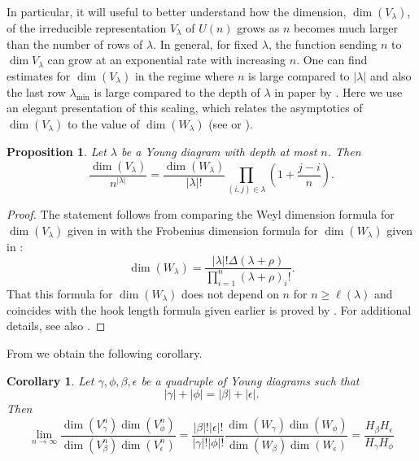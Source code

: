 \documentclass[pdflatex, sn-mathphys-num]{sn-jnl} %
\theoremstyle{plain}
\newtheorem{cor}[thm]{Corollary}
\newtheorem{prop}[thm]{Proposition}
\theoremstyle{definition}
\let\cref\crtcref
\newcommand{\yb}{\beta}
\newcommand{\yc}{\gamma}
\newcommand{\ye}{\epsilon}
\newcommand{\yf}{\phi}
\newcommand{\yx}{\lambda}
\newcommand{\syb}{|\yb|}
\newcommand{\syc}{|\yc|}
\newcommand{\sye}{|\ye|}
\newcommand{\syf}{|\yf|}
\newcommand{\syx}{|\yx|}
\begin{document}
In particular, it will useful to better understand how the dimension, $\dim(V_{\yx})$, of the irreducible representation $V_{\yx}$ of $U(n)$ grows as $n$ becomes much larger than the number of rows of $\yx$.
In general, for fixed $\yx$, the function sending $n$ to $\dim V_{\yx}$ can grow at an exponential rate with increasing $n$.
One can find estimates for $\dim(V_{\yx})$ in the regime where $n$ is large compared to ${\syx}$ and also the last row $\yx_{\min}$ is large compared to the depth of $\yx$ in paper by  \cite[Section III]{itzykson1966unitary}.
Here we use an elegant presentation of this scaling, which relates the asymptotics of $\dim(V_{\yx})$ to the value of $\dim(W_{\yx})$ (see \cite[Lemma 2]{harrow2023approximate} or \cite[Equations (25,26)]{childs2007weak}).
\begin{prop}
    \label{prop:harrow_formula}
    Let $\yx$ be a Young diagram with depth at most $n$. Then
    \begin{equation}
        \frac{\dim(V_{\yx})}{n^{{\syx}}} = \frac{\dim(W_{\yx})}{{\syx}!}\prod_{(i,j) \in \yx} \left(1 + \frac{j-i}{n}\right).
    \end{equation}
\end{prop}
\begin{proof}
    The statement follows from comparing the Weyl dimension formula for $\dim(V_{\yx})$ given in \cref{eq:frob_dim} with the Frobenius dimension formula for $\dim(W_{\yx})$ given in \cite[Corollaries 9.1.5]{goodman2000representations}:
    \begin{equation}
        \label{eq:frob_dim}
        \dim(W_{\yx}) = \frac{{\syx}!\Delta(\yx + \rho)}{\prod_{i=1}^{n}(\yx+\rho)_i!}.
    \end{equation}
    That this formula for $\dim(W_{\yx})$ does not depend on $n$ for $n \geq \ell(\yx)$ and coincides with the hook length formula given earlier is proved by \cite[Corollary 9.1.6]{goodman2000representations}.
    For additional details, see also \cite[Appendix A]{harrow2023approximate}.
\end{proof}
From \cref{prop:harrow_formula} we obtain the following corollary.
\begin{cor}
    \label{cor:harrow_ssa_lim}
    Let $\yc,\yf,\yb,\ye$ be a quadruple of Young diagrams such that
    \begin{equation}
        \label{eq:balanced_sizes}
        {\syc}+{\syf} = {\syb}+{\sye}.
    \end{equation}
    Then
    \begin{equation}
        \lim_{n\to\infty}
        \frac{\dim(V_{\yc}^n) \dim(V_{\yf}^n)}{\dim(V_{\yb}^n) \dim(V_{\ye}^n)} =
        \frac{{\syb}!{\sye}!}{{\syc}!{\syf}!}
        \frac{\dim(W_{\yc}) \dim(W_{\yf})}{\dim(W_{\yb}) \dim(W_{\ye})}
        = \frac{H_{\yb}H_{\ye}}{H_{\yc}H_{\yf}}
    \end{equation}
\end{cor}
\end{document}
